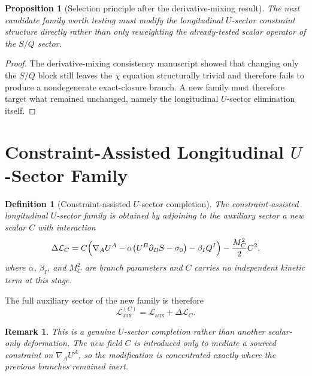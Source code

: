 \documentclass[11pt]{article}
\newtheorem{definition}{Definition}
\newtheorem{proposition}{Proposition}
\newtheorem{remark}{Remark}
\begin{document}
\begin{proposition}[Selection principle after the derivative-mixing result]
The next candidate family worth testing must modify the longitudinal \(U\)-sector constraint structure directly rather than only reweighting the already-tested scalar operator of the \(S/Q\) sector.
\end{proposition}

\begin{proof}
The derivative-mixing consistency manuscript showed that changing only the \(S/Q\) block still leaves the \(\chi\) equation structurally trivial and therefore fails to produce a nondegenerate exact-closure branch. A new family must therefore target what remained unchanged, namely the longitudinal \(U\)-sector elimination itself.
\end{proof}

\section{Constraint-Assisted Longitudinal \texorpdfstring{\(U\)}{U}-Sector Family}

\begin{definition}[Constraint-assisted \(U\)-sector completion]
The constraint-assisted longitudinal \(U\)-sector family is obtained by adjoining to the auxiliary sector a new scalar \(C\) with interaction
\begin{equation}
\Delta\mathcal L_C
=
C\Bigl(\nabla_AU^A-\alpha\bigl(U^B\partial_BS-\sigma_0\bigr)-\beta_IQ^I\Bigr)
-\frac{M_C^2}{2}C^2,
\label{eq:LC}
\end{equation}
where \(\alpha\), \(\beta_I\), and \(M_C^2\) are branch parameters and \(C\) carries no independent kinetic term at this stage.
\end{definition}

The full auxiliary sector of the new family is therefore
\begin{equation}
\mathcal L_{\mathrm{aux}}^{(C)}
=
\mathcal L_{\mathrm{aux}}
+\Delta\mathcal L_C.
\label{eq:LauxC}
\end{equation}

\begin{remark}
This is a genuine \(U\)-sector completion rather than another scalar-only deformation. The new field \(C\) is introduced only to mediate a sourced constraint on \(\nabla_AU^A\), so the modification is concentrated exactly where the previous branches remained inert.
\end{remark}
\end{document}
